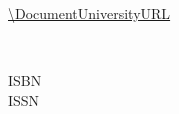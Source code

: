 \newpage
\vspace*{\fill}
\noindent
\DocumentUniversity\\ %
\uppercase{\DocumentUniversityPostalCode} \DocumentUniversityCity\\
\uppercase{\DocumentUniversityCountry}\\
\url{\DocumentUniversityURL}

\bigskip\noindent
\textcopyright\ \DocumentYear\ \DocumentAuthor%

\bigskip\noindent
ISBN \DocumentISBN \\
ISSN \DocumentISSN \\
\DocumentExtraIdentifier
